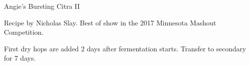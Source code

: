 \begin{recipe}{Angie's Bursting Citra II} %

\begin{aboutblock}
Recipe by Nicholas Slay. Best of show in the 2017 Minnesota Mashout Competition.
\end{aboutblock}


\begin{methodandtiming}
 
\begin{mashsteps}
\end{mashsteps}

\begin{fermentationsteps}
\end{fermentationsteps}

\begin{directions}
First dry hops are added 2 days after fermentation starts. Transfer to
secondary for 7 days.
\end{directions}

\end{methodandtiming}

\recipebreak

\begin{ingredientsblock}

\begin{malts}
\end{malts}

\begin{hops}
\end{hops}


\end{ingredientsblock}

\end{recipe}


